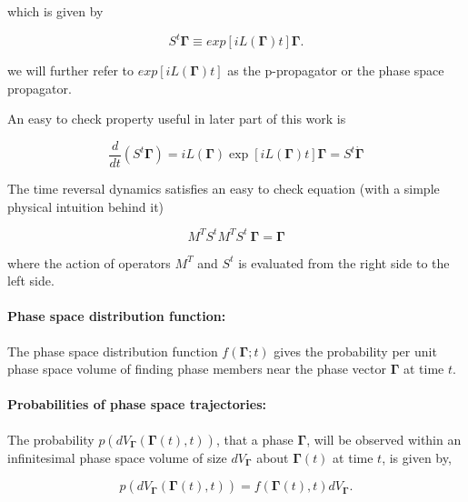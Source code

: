 \documentclass[a4paper,12pt]{article}
\begin{document}
which is given by

\begin{equation}
  S^t \bm{\Gamma} \equiv exp[iL(\bm{\Gamma})t]\bm{\Gamma}.
\end{equation}


we will further refer to $ exp[iL(\bm{\Gamma})t] $ as the p-propagator or the phase space propagator.


An easy to check property useful in later part of this work is

\begin{equation}
\label{PhaseTimeDer}
  \frac{d}{dt}(S^t \bm{\Gamma})=iL(\bm{\Gamma})\exp[iL(\bm{\Gamma})t]\bm{\Gamma}=S^t \dot{\bm{\Gamma}}
\end{equation}



The time reversal dynamics satisfies an easy to check equation (with a simple physical intuition behind it)

\begin{equation}
  M^T S^t M^T S^t\ \bm{\Gamma} = \bm{\Gamma}
\end{equation}

where the action of operators $M^T$ and $S^t$ is evaluated from the right side to the left side.






\paragraph{Phase space distribution function:}

The phase space distribution function $f(\bm{\Gamma};t)$ gives the probability per unit phase space volume of finding phase members near the phase vector $\bm{\Gamma}$ at time $t$.

\paragraph{Probabilities of phase space trajectories: }
The probability $p(d V_{\bm{\Gamma}}(\bm{\Gamma}(t),t))$, that a phase $\bm{\Gamma}$, will be observed within an infinitesimal phase space volume of size $d V_{\bm{\Gamma}}$ about $\bm{\Gamma}(t)$ at time $t$, is given by,

\begin{equation}
  p(d V_{\bm{\Gamma}}(\bm{\Gamma}(t),t)) = f(\bm{\Gamma}(t),t)d V_{\bm{\Gamma}}.
\end{equation}
\end{document}
